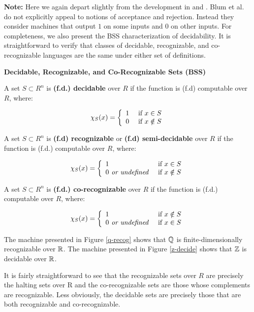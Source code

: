 \textbf{Note:} Here we again depart slightly from the development in
\cite{B89} and \cite{B98}.  Blum et al. do not explicitly appeal to
notions of acceptance and rejection.  Instead they consider machines
that output $1$ on some inputs and $0$ on other inputs.  For
completeness, we also present the BSS characterization of
decidability.  It is straightforward to verify that classes of
decidable, recognizable, and co-recognizable languages are the same
under either set of definitions.

\begin{definition}{\textbf{Decidable, Recognizable, and Co-Recognizable Sets (BSS)}}

  A set $S \subset R^n$ is \textbf{(f.d.) decidable} over $R$ if the
  function  is (f.d) computable over $R$,
  where:
  
  $$\chi_S(x) =  \left\{ \begin{array}{ll} 1 & \text{ if } x \in S \\ 0 & \text{ if } x \notin S \end{array} \right.$$
  
  A set $S \subset R^n$ is \textbf{(f.d) recognizable} or
  \textbf{(f.d) semi-decidable} over $R$ if the function
   is (f.d.) computable over $R$, where:
  
  $$\chi_S(x) = \left\{ \begin{array}{ll} 1 & \text{ if } x \in S \\ 0 \text{\emph{ or undefined}} & \text{ if } x \notin S \end{array} \right.$$
  \vspace{\baselineskip}
  
  A set $S \subset R^n$ is \textbf{(f.d.) co-recognizable} over $R$ if
  the function  is (f.d.) computable over $R$,
  where:
  
  $$\chi_S(x) =  \left\{ \begin{array}{ll} 1 & \text{ if } x \notin S \\ 0 \text{\emph{ or undefined}} & \text{ if } x \in S \end{array} \right.$$
  
\end{definition}

\begin{example}
  The machine presented in Figure \ref{q-recog} shows that
  $\mathbb{Q}$ is finite-dimensionally recognizable over $\mathbb{R}$.
  The machine presented in Figure \ref{z-decide} shows that
  $\mathbb{Z}$ is decidable over $\mathbb{R}$.
\end{example}

It is fairly straightforward to see that the recognizable sets over
$R$ are precisely the halting sets over R and the co-recognizable sets
are those whose complements are recognizable. Less obviously, the
decidable sets are precisely those that are both recognizable and
co-recognizable.

